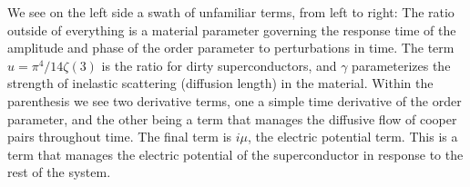 \documentclass[10pt,twoside]{report}
\numberwithin{equation}{chapter}
\begin{document}
We see on the left side a swath of unfamiliar terms, from left to right:  The ratio outside of everything is a material parameter governing the response time of the amplitude and phase of the order parameter to perturbations in time.  The term $u = \pi^{4}/14\zeta(3)$ is the ratio for dirty superconductors, and $\gamma$ parameterizes the strength of inelastic scattering (diffusion length) in the material.  Within the parenthesis we see two derivative terms, one a simple time derivative of the order parameter, and the other being a term that manages the diffusive flow of cooper pairs throughout time.  The final term is $i\mu$, the electric potential term.  This is a term that manages the electric potential of the superconductor in response to the rest of the system.
\end{document}
